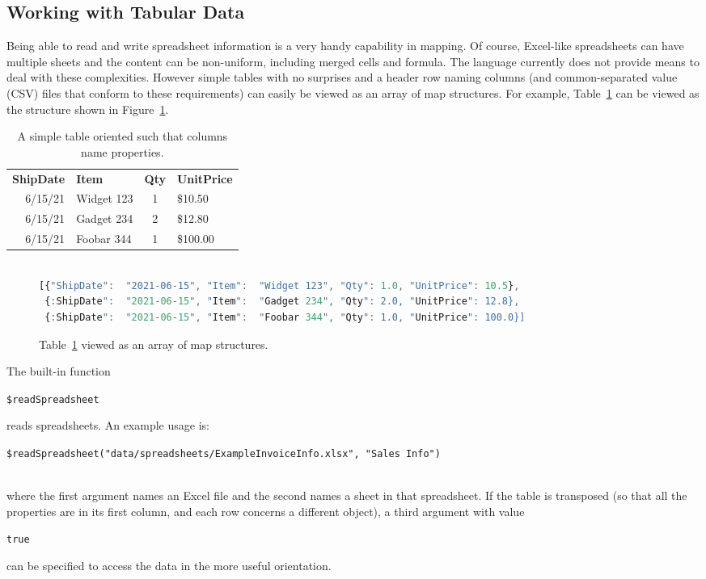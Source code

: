 \documentclass[9pt,letterpaper]{article}
\newcommand{\stt}[1]{\begin{footnotesize}\texttt{#1}\end{footnotesize}}
\begin{document}
\subsection{Working with Tabular Data}

Being able to read  and write spreadsheet information is a very handy capability in mapping.
Of course, Excel-like spreadsheets can have multiple sheets and the content can be non-uniform, including merged cells and formula.
The language currently does not provide means to deal with these complexities.
However simple tables with no surprises and a header row naming columns (and common-separated value (CSV) files that conform to these requirements) can easily be viewed as an array of map structures.
For example, Table~\ref{table:simple} can be viewed as the structure shown in Figure~\ref{code:simple}.

\begin{table}[H]
  \caption{A simple table oriented such that columns name properties.}
\label{table:simple}
\begin{tabular}{r | l | c | l}

\textbf{ShipDate}& \textbf{Item}& \textbf{Qty}& \textbf{UnitPrice} \\ \hhline{=|=|=|=}
        6/15/21	      & Widget 123   &	1	   &  \$10.50 \\
        6/15/21	      & Gadget 234   &	2	   &  \$12.80 \\
        6/15/21	      & Foobar 344   &	1	   &  \$100.00
\end{tabular}
\end{table}

\begin{figure}[H]
    \caption{Table~\ref{table:simple} viewed as an array of map structures.}
    \label{code:simple}
\begin{lstlisting}[language=JavaScript]

[{"ShipDate":  "2021-06-15", "Item":  "Widget 123", "Qty": 1.0, "UnitPrice": 10.5},
 {:ShipDate":  "2021-06-15", "Item":  "Gadget 234", "Qty": 2.0, "UnitPrice": 12.8},
 {:ShipDate":  "2021-06-15", "Item":  "Foobar 344", "Qty": 1.0, "UnitPrice": 100.0}]
\end{lstlisting}
\end{figure}

The built-in function \stt{\$readSpreadsheet} reads spreadsheets.
An example usage is:\\
\vspace{3mm}
\stt{\$readSpreadsheet("data/spreadsheets/ExampleInvoiceInfo.xlsx", "Sales Info")} \\
\vspace{3mm}
where the first argument names an Excel file and the second names a sheet in that spreadsheet.
If the table is transposed (so that all the properties are in its first column, and each row concerns a different object), a third argument with value \stt{true} can be specified to access the data in the more useful orientation.
\end{document}
